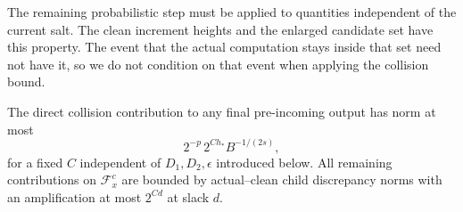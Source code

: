 The remaining probabilistic step must be applied to quantities independent of the current salt. The clean increment heights and the enlarged candidate set have this property. The event that the actual computation stays inside that set need not have it, so we do not condition on that event when applying the collision bound.

\begin{lemma}\label{lem:fp-direct}
The direct collision contribution to any final pre-incoming output has
norm at most
\begin{equation}
             2^{-p}\,2^{C h_*}B^{-1/(2s)},
 \label{eq:fp-direct-charge}
\end{equation}
for a fixed $C$ independent of $D_1,D_2,\epsilon$ introduced below.
All remaining contributions on $\mathcal F_x^c$ are bounded by
actual--clean child discrepancy norms with an amplification at most
$2^{C d}$ at slack $d$.
\end{lemma}

